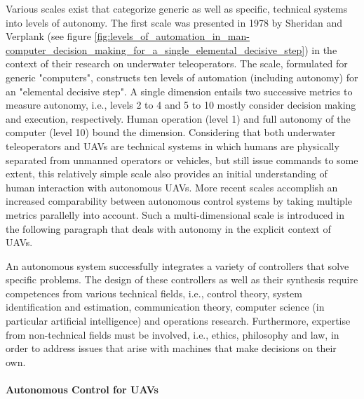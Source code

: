 Various scales exist that categorize generic as well as specific, technical systems into levels of autonomy. \cite{Williams}
The first scale was presented in 1978 by Sheridan and Verplank \cite{Sheridan1978} 
(see figure \ref{fig:levels_of_automation_in_man-computer_decision_making_for_a_single_elemental_decisive_step})
in the context of their research on underwater teleoperators.
The scale, formulated for generic "computers", constructs ten levels of automation (including autonomy) for an "elemental decisive step".
A single dimension entails two successive metrics to measure autonomy, i.e., levels 2 to 4 and 5 to 10 
mostly consider decision making and execution, respectively.
Human operation (level 1) and full autonomy of the computer (level 10) bound the dimension.
Considering that both underwater teleoperators and UAVs are technical systems 
in which humans are physically separated from unmanned operators or vehicles, but still issue commands to some extent,
this relatively simple scale also provides an initial understanding of human interaction with autonomous UAVs.
More recent scales accomplish an increased comparability between autonomous control systems by taking multiple metrics parallelly into account.
Such a multi-dimensional scale is introduced in the following paragraph that deals with autonomy in the explicit context of UAVs.


An autonomous system successfully integrates a variety of controllers that solve specific problems.
The design of these controllers as well as their synthesis require competences from various technical fields,
i.e., control theory, system identification and estimation, communication theory,
computer science (in particular artificial intelligence) and operations research.
Furthermore, expertise from non-technical fields must be involved, i.e., ethics, philosophy and law,
in order to address issues that arise with machines that make decisions on their own.






\paragraph{Autonomous Control for UAVs}

